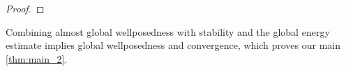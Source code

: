 \documentclass[preprint]{elsarticle}
\numberwithin{equation}{section}
\newcommand {\E}	{\mathbb{E}}
\renewcommand{\H}{\mathrm{H}}
\newcommand{\rL}{\mathrm{L}}
\newcommand{\rH}{\H}
\newcommand{\rB}{\mathrm{B}}
\newcommand{\btb}{\color{black}}
\newcommand{\etb}{\color{black}}
\begin{document}
\begin{proof}
\end{proof}

Combining almost global wellposedness with stability and the global energy estimate implies global wellposedness and convergence, which proves our main \autoref{thm:main_2}. 
\end{document}
